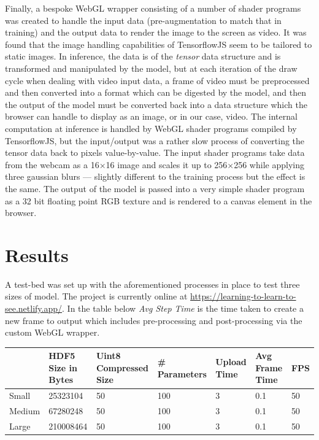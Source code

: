 \documentclass[a4paper]{article}
\begin{document}
Finally, a bespoke WebGL wrapper consisting of a number of shader programs was created to handle the input data (pre-augmentation to match that in training) and the output data to render the image to the screen as video. It was found that the image handling capabilities of TensorflowJS seem to be tailored to static images. In inference, the data is of the \textit{tensor} data structure and is transformed and manipulated by the model, but at each iteration of the draw cycle when dealing with video input data, a frame of video must be preprocessed and then converted into a format which can be digested by the model, and then the output of the model must be converted back into a data structure which the browser can handle to display as an image, or in our case, video. The internal computation at inference is handled by WebGL shader programs compiled by TensorflowJS, but the input/output was a rather slow process of converting the tensor data back to pixels value-by-value. The input shader programs take data from the webcam as a 16$\times$16 image and scales it up to 256$\times$256 while applying three gaussian blurs --- slightly different to the training process but the effect is the same. The output of the model is passed into a very simple shader program as a 32 bit floating point RGB texture and is rendered to a canvas element in the browser.

\section{Results}
A test-bed was set up with the aforementioned processes in place to test three sizes of model. The project is currently online at \url{https://learning-to-learn-to-see.netlify.app/}. In the table below \textit{Avg Step Time} is the time taken to create a new frame to output which includes pre-processing and post-processing via the custom WebGL wrapper.

\begin{small}
	\begin{center}
		\begin{tabular}{p{1.5cm} p{1.5cm} p{1.5cm} p{1.5cm} p{1.5cm} p{1.5cm} p{1cm}}
			       & HDF5 Size in Bytes & Uint8 Compressed Size & \# Parameters & Upload Time & Avg Frame Time & FPS \\
			\hline
			Small  & 25323104           & 50                    & 100           & 3           & 0.1            & 50  \\
			Medium & 67280248           & 50                    & 100           & 3           & 0.1            & 50  \\
			Large  & 210008464          & 50                    & 100           & 3           & 0.1            & 50  \\
			\hline
		\end{tabular}
	\end{center}
\end{small}
\end{document}
